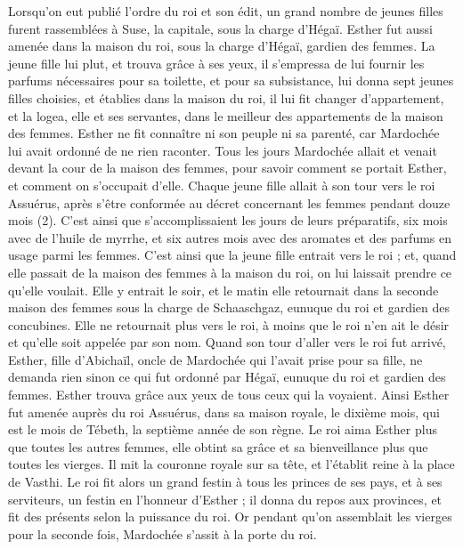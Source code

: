 \begin{multicols}{2}
Lorsqu’on eut publié l’ordre du roi et son édit, un grand nombre de jeunes filles furent rassemblées à Suse, la capitale, sous la charge d'Hégaï. Esther fut aussi amenée dans la maison du roi, sous la charge d'Hégaï, gardien des femmes.
La jeune fille lui plut, et trouva grâce à ses yeux, il s’empressa de lui fournir les parfums nécessaires pour sa toilette, et pour sa subsistance, lui donna sept jeunes filles choisies, et établies dans la maison du roi, il lui fit changer d'appartement, et la logea, elle et ses servantes, dans le meilleur des appartements de la maison des femmes.
Esther ne fit connaître ni son peuple ni sa parenté, car Mardochée lui avait ordonné de ne rien raconter.
Tous les jours Mardochée allait et venait devant la cour de la maison des femmes, pour savoir comment se portait Esther, et comment on s’occupait d'elle.
Chaque jeune fille allait à son tour vers le roi Assuérus, après s’être conformée au décret concernant les femmes pendant douze mois (2). C'est ainsi que s'accomplissaient les jours de leurs préparatifs, six mois avec de l'huile de myrrhe, et six autres mois avec des aromates et des parfums en usage parmi les femmes.
C'est ainsi que la jeune fille entrait vers le roi ; et, quand elle passait de la maison des femmes à la maison du roi, on lui laissait prendre ce qu’elle voulait.
Elle y entrait le soir, et le matin elle retournait dans la seconde maison des femmes sous la charge de Schaaschgaz, eunuque du roi et gardien des concubines. Elle ne retournait plus vers le roi, à moins que le roi n’en ait le désir et qu'elle soit appelée par son nom.
Quand son tour d’aller vers le roi fut arrivé, Esther, fille d'Abichaïl, oncle de Mardochée qui l’avait prise pour sa fille, ne demanda rien sinon ce qui fut ordonné par Hégaï, eunuque du roi et gardien des femmes. Esther trouva grâce aux yeux de tous ceux qui la voyaient.
Ainsi Esther fut amenée auprès du roi Assuérus, dans sa maison royale, le dixième mois, qui est le mois de Tébeth, la septième année de son règne.
Le roi aima Esther plus que toutes les autres femmes, elle obtint sa grâce et sa bienveillance plus que toutes les vierges. Il mit la couronne royale sur sa tête, et l'établit reine à la place de Vasthi.
Le roi fit alors un grand festin à tous les princes de ses pays, et à ses serviteurs, un festin en l’honneur d'Esther ; il donna du repos aux provinces, et fit des présents selon la puissance du roi.
Or pendant qu'on assemblait les vierges pour la seconde fois, Mardochée s’assit à la porte du roi.

\end{multicols}
